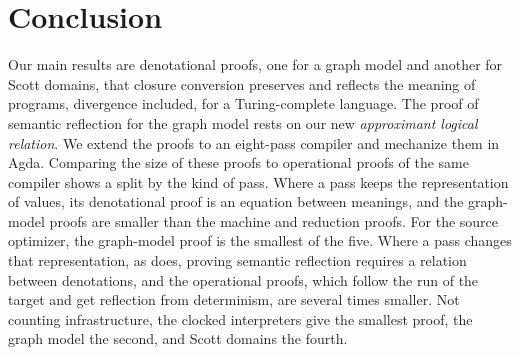 
\section{Conclusion}
\label{sec:conclusion}

Our main results are denotational proofs, one for a graph model and
another for Scott domains, that closure conversion preserves and
reflects the meaning of programs, divergence included, for a
Turing-complete language. The proof of semantic reflection for the
graph model rests on our new \emph{approximant logical relation}.  We
extend the proofs to an eight-pass compiler and mechanize them in
Agda.  Comparing the size of these proofs to operational proofs of the
same compiler shows a split by the kind of pass. Where a pass keeps
the representation of values, its denotational proof is an equation
between meanings, and the graph-model proofs are smaller than the
machine and reduction proofs. For the source optimizer, the
graph-model proof is the smallest of the five. Where a pass changes
that representation, as  does, proving semantic
reflection requires a relation between denotations, and the
operational proofs, which follow the run of the target and get
reflection from determinism, are several times smaller.  Not counting
infrastructure, the clocked interpreters give the smallest proof, the
graph model the second, and Scott domains the fourth.
